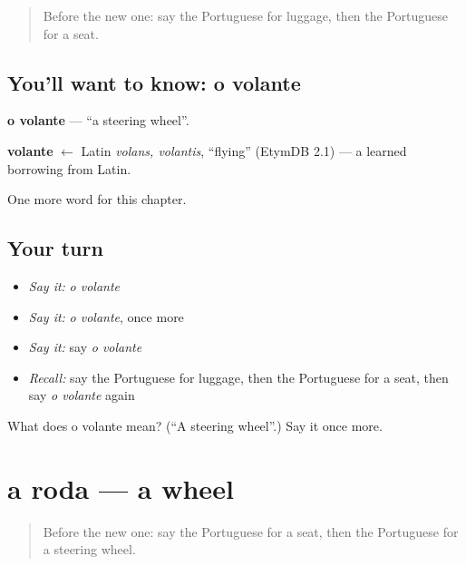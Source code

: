 \label{lesson:PT-C223-volante}



\begin{quote}
Before the new one: say the Portuguese for luggage, then the Portuguese for a seat.
\end{quote}

\subsection*{You'll want to know: o volante}
\textbf{o volante} — \textquotedblleft{}a steering wheel\textquotedblright{}.

\begin{cousinweb}
\textbf{volante} $\leftarrow$ Latin \emph{volans, volantis}, \textquotedblleft{}flying\textquotedblright{} (EtymDB 2.1) — a learned borrowing from Latin.
\end{cousinweb}

\begin{grammarlens}[title={What you've built}]
One more word for this chapter.
\end{grammarlens}

\subsection*{Your turn}
\begin{itemize}
\raggedright
  \item \emph{Say it:} \emph{o volante}
  \item \emph{Say it:} \emph{o volante}, once more
  \item \emph{Say it:} say \emph{o volante}
  \item \emph{Recall:} say the Portuguese for luggage, then the Portuguese for a seat, then say \emph{o volante} again
\end{itemize}

\begin{tcolorbox}[breakable,colback=teal!4,colframe=teal!35!black,title={Before you move on}]
What does o volante mean? (\textquotedblleft{}A steering wheel\textquotedblright{}.) Say it once more.
\end{tcolorbox}
\section[a roda]{a roda — a wheel}

\label{lesson:PT-C223-roda}



\begin{quote}
Before the new one: say the Portuguese for a seat, then the Portuguese for a steering wheel.
\end{quote}


